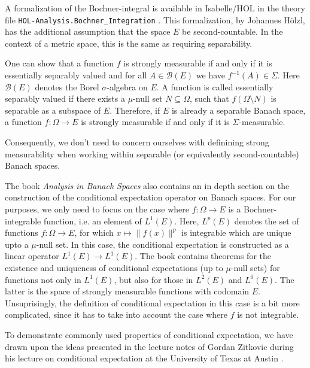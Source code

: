 A formalization of the Bochner-integral is available in Isabelle/HOL in the theory file \texttt{HOL-Analysis.Bochner\_Integration} \cite{hoelzl2011measuretheory}. This formalization, by Johannes Hölzl, has the additional assumption that the space $E$ be second-countable. In the context of a metric space, this is the same as requiring separability.
\vspace{0.3cm}
\begin{remark}

One can show that a function $f$ is strongly measurable if and only if it is essentially separably valued and for all $A \in \mathcal{B}(E)$ we have $f^{-1}(A) \in \Sigma$. Here $\mathcal{B}(E)$ denotes the Borel $\sigma$-algebra on $E$. A function is called essentially separably valued if there exists a $\mu$-null set $N \subseteq \Omega$, such that $f (\Omega \setminus N)$ is separable as a subspace of $E$. Therefore, if $E$ is already a separable Banach space, a function $f : \Omega \rightarrow E$ is strongly measurable if and only if it is $\Sigma$-measurable.

Consequently, we don't need to concern ourselves with definining strong measurability when working within separable (or equivalently second-countable) Banach spaces.
\end{remark}
\vspace{0.3cm}

The book \textit{Analysis in Banach Spaces} also contains an in depth section on the construction of the conditional expectation operator on Banach spaces. For our purposes, we only need to focus on the case where $f : \Omega \rightarrow E$ is a Bochner-integrable function, i.e. an element of $L^1(E)$. Here, $L^p(E)$ denotes the set of functions $f: \Omega \rightarrow E$, for which $x \mapsto \lVert f(x) \rVert^p$ is integrable which are unique upto a $\mu$-null set. In this case, the conditional expectation is constructed as a linear operator $L^1(E) \rightarrow L^1(E)$. The book contains theorems for the existence and uniqueness of conditional expectations (up to $\mu$-null sets) for functions not only in $L^1(E)$, but also for those in $L^2(E)$ and $L^0(E)$. The latter is the space of strongly measurable functions with codomain $E$. Unsuprisingly, the definition of conditional expectation in this case is a bit more complicated, since it has to take into account the case where $f$ is not integrable.

To demonstrate commonly used properties of conditional expectation, we have drawn upon the ideas presented in the lecture notes of Gordan Zitkovic during his lecture on conditional expectation at the University of Texas at Austin \cite{Zitkovic_2015}.

